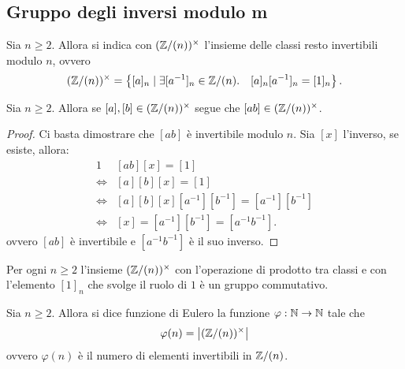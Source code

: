 \subsection{Gruppo degli inversi modulo m}

\begin{definition}
    Sia $n \geq 2$. Allora si indica con $(\mathbb{Z}/(n))^{\times}$ l'insieme delle classi resto invertibili modulo $n$, ovvero \begin{equation}
        (\mathbb{Z}/(n))^{\times} = \left\{[a]_n \mid \exists [a^{-1}]_n \in \mathbb{Z}/(n). \quad [a]_n[a^{-1}]_n = [1]_n\right\}.
    \end{equation} 
\end{definition}

\begin{proposition}\label{prodotto_invertibili_invertibile}
    Sia $n \geq 2$. Allora se $[a], [b] \in (\mathbb{Z}/(n))^{\times}$ segue che $[ab] \in (\mathbb{Z}/(n))^{\times}$.
\end{proposition}
\begin{proof}
    Ci basta dimostrare che $[ab]$ è invertibile modulo $n$. Sia $[x]$ l'inverso, se esiste, allora:
    \begin{alignat*}{1}
        &[ab][x] = [1] \\
        \iff &[a][b][x] = [1] \\
        \iff &[a][b][x][a^{-1}][b^{-1}] = [a^{-1}][b^{-1}] \\
        \iff &[x] = [a^{-1}][b^{-1}] = [a^{-1}b^{-1}].
    \end{alignat*}
    ovvero $[ab]$ è invertibile e $[a^{-1}b^{-1}]$ è il suo inverso.
\end{proof}

\begin{proposition}\label{Z(n)*_gruppo}
    Per ogni $n \geq 2$ l'insieme $(\mathbb{Z}/(n))^{\times}$ con l'operazione di prodotto tra classi e con l'elemento $[1]_n$ che svolge il ruolo di $1$ è un gruppo commutativo.
\end{proposition}

\begin{definition}
    Sia $n \geq 2$. Allora si dice funzione di Eulero la funzione $\varphi : \mathbb{N} \to \mathbb{N}$ tale che \begin{equation}
        \varphi(n) = \left|(\mathbb{Z}/(n))^{\times}\right|
    \end{equation}
    ovvero $\varphi(n)$ è il numero di elementi invertibili in $\mathbb{Z}/(n)$.
\end{definition}

